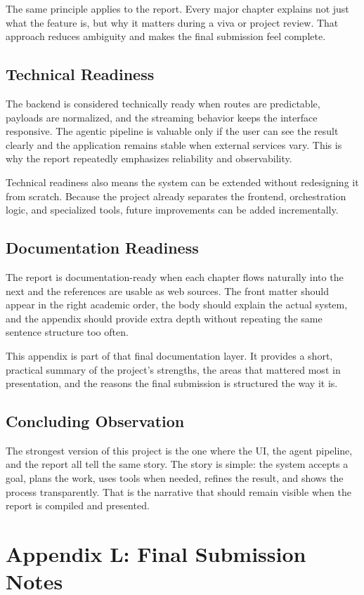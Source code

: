 \documentclass[11pt,oneside]{report}
\begin{document}
The same principle applies to the report. Every major chapter explains not just what the feature is, but why it matters during a viva or project review. That approach reduces ambiguity and makes the final submission feel complete.

\section{Technical Readiness}
The backend is considered technically ready when routes are predictable, payloads are normalized, and the streaming behavior keeps the interface responsive. The agentic pipeline is valuable only if the user can see the result clearly and the application remains stable when external services vary. This is why the report repeatedly emphasizes reliability and observability.

Technical readiness also means the system can be extended without redesigning it from scratch. Because the project already separates the frontend, orchestration logic, and specialized tools, future improvements can be added incrementally.

\section{Documentation Readiness}
The report is documentation-ready when each chapter flows naturally into the next and the references are usable as web sources. The front matter should appear in the right academic order, the body should explain the actual system, and the appendix should provide extra depth without repeating the same sentence structure too often.

This appendix is part of that final documentation layer. It provides a short, practical summary of the project’s strengths, the areas that mattered most in presentation, and the reasons the final submission is structured the way it is.

\section{Concluding Observation}
The strongest version of this project is the one where the UI, the agent pipeline, and the report all tell the same story. The story is simple: the system accepts a goal, plans the work, uses tools when needed, refines the result, and shows the process transparently. That is the narrative that should remain visible when the report is compiled and presented.

\chapter{Appendix L: Final Submission Notes}
\end{document}
